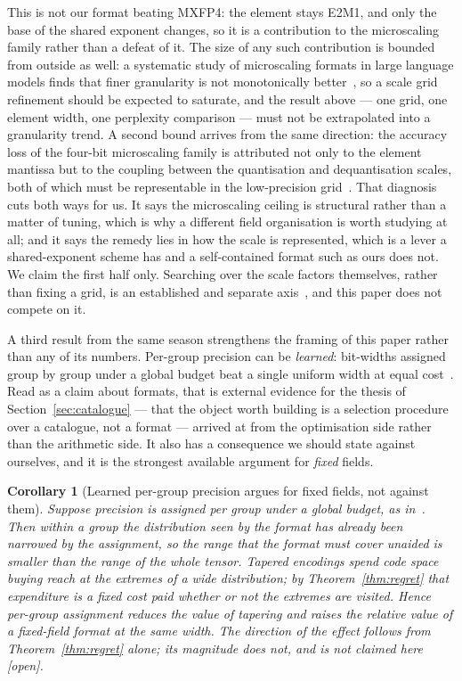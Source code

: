 \documentclass[11pt]{article}
\newtheorem{corollary}{Corollary}
\theoremstyle{definition}
\begin{document}
This is not our format beating MXFP4: the element stays
E2M1, and only the base of the shared exponent changes, so it is a contribution
to the microscaling family rather than a defeat of it. The size of any such
contribution is bounded from outside as well: a systematic study of microscaling
formats in large language models finds that finer granularity is not monotonically
better~\cite{fasoli2026}, so a scale grid refinement should be expected to
saturate, and the result above --- one grid, one element width, one perplexity
comparison --- must not be extrapolated into a granularity trend. A second bound
arrives from the same direction: the accuracy loss of the four-bit microscaling
family is attributed not only to the element mantissa but to the coupling between
the quantisation and dequantisation scales, both of which must be representable in
the low-precision grid~\cite{yan2026focus}. That diagnosis cuts both ways for us.
It says the microscaling ceiling is structural rather than a matter of tuning,
which is why a different field organisation is worth studying at all; and it says
the remedy lies in how the scale is represented, which is a lever a shared-exponent
scheme has and a self-contained format such as ours does not. We claim the first
half only. Searching over
the scale factors themselves, rather than fixing a grid, is an established and
separate axis~\cite{gupta2026scalesearch}, and this paper does not compete on it.

A third result from the same season strengthens the framing of this paper rather
than any of its numbers. Per-group precision can be \emph{learned}: bit-widths
assigned group by group under a global budget beat a single uniform width at equal
cost~\cite{ogilvy2026variable}. Read as a claim about formats, that is external
evidence for the thesis of Section~\ref{sec:catalogue} --- that the object worth
building is a selection procedure over a catalogue, not a format --- arrived at from
the optimisation side rather than the arithmetic side. It also has a consequence we
should state against ourselves, and it is the strongest available argument for
\emph{fixed} fields.

\begin{corollary}[Learned per-group precision argues for fixed fields, not against them]
\label{cor:pergroup}
Suppose precision is assigned per group under a global budget, as
in~\cite{ogilvy2026variable}. Then within a group the distribution seen by the
format has already been narrowed by the assignment, so the range that the format
must cover unaided is smaller than the range of the whole tensor. Tapered encodings
spend code space buying reach at the extremes of a wide distribution; by
Theorem~\ref{thm:regret} that expenditure is a fixed cost paid whether or not the
extremes are visited. Hence per-group assignment reduces the value of tapering and
raises the relative value of a fixed-field format at the same width. The direction
of the effect follows from Theorem~\ref{thm:regret} alone; its magnitude does not,
and is not claimed here [\emph{open}].
\end{corollary}
\end{document}
